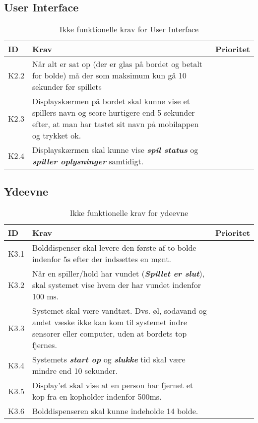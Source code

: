 \documentclass[Kravspecifikation/Kravspec_Main.tex]{subfiles}
\begin{document}
\subsection{User Interface}
\begin{table}[H]
\begin{tabular}{|L{0.1\textwidth}|L{0.75\textwidth}|L{0.15\textwidth}|}
\hline
\textbf{ID} & \textbf{Krav} & \textbf{Prioritet} \\ \hline
K2.2 & Når alt er sat op (der er glas på bordet og betalt for bolde) må der som maksimum kun gå 10 sekunder før spillets &  \\ \hline
K2.3 & Displayskærmen på bordet skal kunne vise et spillers navn og score hurtigere end 5 sekunder efter, at man har tastet sit navn på mobilappen og trykket ok. &  \\ \hline
K2.4 & Displayskærmen skal kunne vise \textit{\textbf{spil status}} og \textit{\textbf{spiller oplysninger}} samtidigt. & \\ \hline
\end{tabular}
\caption{Ikke funktionelle krav for User Interface}
\label{tab:user_interface}
\end{table}

\subsection{Ydeevne}
\begin{table}[H]
\begin{tabular}{|L{0.1\textwidth}|L{0.75\textwidth}|L{0.15\textwidth}|}
\hline
\textbf{ID} & \textbf{Krav} & \textbf{Prioritet} \\ \hline
K3.1 & Bolddispenser skal levere den første af to bolde indenfor 5s efter der indsættes en mønt. &  \\ \hline
K3.2 & Når en spiller/hold har vundet (\textit{\textbf{Spillet er slut}}), skal systemet vise hvem der har vundet indenfor 100 ms. &  \\ \hline
K3.3 & Systemet skal være vandtæt. Dvs. øl, sodavand og andet væske ikke kan kom til systemet indre sensorer eller computer, uden at bordets top fjernes. &  \\ \hline
K3.4 & Systemets \textbf{\textit{start op}} og \textbf{\textit{slukke}} tid skal være mindre end 10 sekunder. &  \\ \hline
K3.5 & Display'et skal vise at en person har fjernet et kop fra en kopholder indenfor 500ms. &  \\ \hline
K3.6 & Bolddispenseren skal kunne indeholde 14 bolde. & \\ \hline
\end{tabular}
\caption{Ikke funktionelle krav for ydeevne}
\label{tab:ydeevne}
\end{table}
\end{document}
